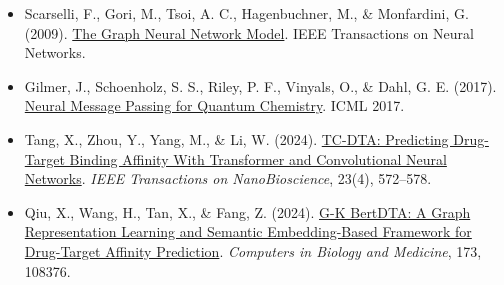 \vspace{0.25em}
\begin{itemize}
\tightlist
\item
  Scarselli, F., Gori, M., Tsoi, A. C., Hagenbuchner, M., \& Monfardini, G. (2009). \href{https://doi.org/10.1109/TNN.2008.2005605}{The Graph Neural Network Model}. IEEE Transactions on Neural Networks.
\item
  Gilmer, J., Schoenholz, S. S., Riley, P. F., Vinyals, O., \& Dahl, G. E. (2017). \href{https://proceedings.mlr.press/v70/gilmer17a.html}{Neural Message Passing for Quantum Chemistry}. ICML 2017.
\item
  Tang, X., Zhou, Y., Yang, M., \& Li, W. (2024). \href{https://doi.org/10.1109/TNB.2024.3441590}{TC-DTA: Predicting Drug-Target Binding Affinity With Transformer and Convolutional Neural Networks}. \emph{IEEE Transactions on NanoBioscience}, 23(4), 572--578.
\item
  Qiu, X., Wang, H., Tan, X., \& Fang, Z. (2024). \href{https://doi.org/10.1016/j.compbiomed.2024.108376}{G-K BertDTA: A Graph Representation Learning and Semantic Embedding-Based Framework for Drug-Target Affinity Prediction}. \emph{Computers in Biology and Medicine}, 173, 108376.
\end{itemize}

\clearpage
